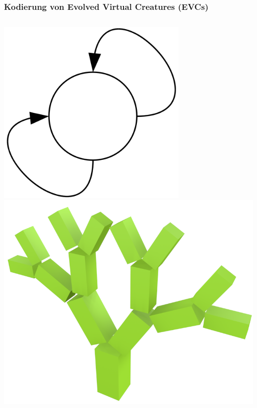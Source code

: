 \documentclass{beamer}
\begin{document}
\begin{frame}
	\frametitle{Kodierung von Evolved Virtual Creatures (EVCs)}
	\begin{columns}[c]
		\centering
		\includegraphics[width=0.7\textwidth]{img/g3.png} \pause
		\centering
		\includegraphics[width=\textwidth]{img/3.png}
	\end{columns}
\end{frame}
\end{document}
